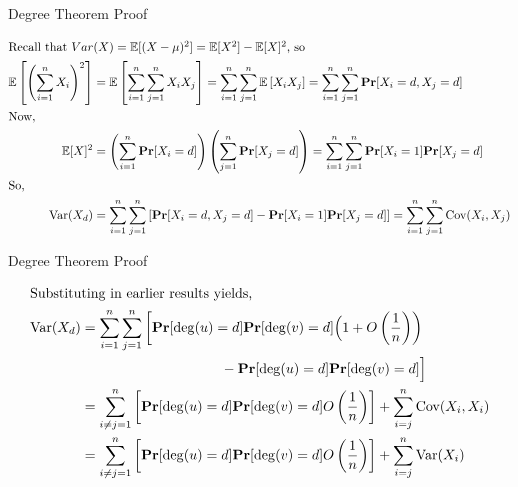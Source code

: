 \begin{frame}{Degree Theorem Proof}
    \setlength{\abovedisplayskip}{2pt}
        \setlength{\belowdisplayskip}{0pt}
        \setlength{\abovedisplayshortskip}{2pt}
        \setlength{\belowdisplayshortskip}{0pt}
    \begin{proofs}
        \begin{align*}
            \intertext{Recall that $Var(X) = \mathbb{E}[(X - \mu)^2] = \mathbb{E}[X^2] - \mathbb{E}[X]^2$, so}
            \mathbb{E}\left[\left(\sum_{i = 1}^n X_i\right)^2\right] &= \mathbb{E}\left[\sum_{i = 1}^n \sum_{j = 1}^n X_iX_j\right]  = \sum_{i = 1}^n \sum_{j = 1}^n\mathbb{E}\left[X_iX_j\right] = \sum_{i = 1}^n \sum_{j = 1}^n\textbf{Pr}[X_i = d, X_j = d]\\
            \intertext{Now,}
            \mathbb{E}[X]^2 &= \left(\sum_{i = 1}^n\textbf{Pr}[X_i = d]\right)\left(\sum_{j = 1}^n\textbf{Pr}[X_j = d]\right) = \sum_{ i =1}^n \sum_{j = 1}^n \textbf{Pr}[X_i = 1] \textbf{Pr}[X_j = d]\\
            \intertext{So,}
            \text{Var}(X_d) &= \sum_{ i =1}^n \sum_{j = 1}^n \left[\textbf{Pr}[X_i = d, X_j = d] - \textbf{Pr}[X_i = 1] \textbf{Pr}[X_j = d]\right] = \sum_{i = 1}^n\sum_{j = 1}^n \text{Cov}(X_i, X_j)
        \end{align*}
    \end{proofs}
\end{frame}

\begin{frame}{Degree Theorem Proof}
    \setlength{\abovedisplayskip}{2pt}
        \setlength{\belowdisplayskip}{0pt}
        \setlength{\abovedisplayshortskip}{2pt}
        \setlength{\belowdisplayshortskip}{0pt}
    \begin{proofs}
        \begin{align*}
            \intertext{Substituting in earlier results yields,}
            \text{Var}(X_d) &= \sum_{ i =1}^n \sum_{j = 1}^n \left[\textbf{Pr}[\deg(u) = d]\textbf{Pr}[\deg(v) = d]\Big(1 + O\left(\frac{1}{n}\right)\right) \\
            &\qquad \qquad \qquad \qquad \qquad- \textbf{Pr}[\deg(u) = d]\textbf{Pr}[\deg(v) = d]\Big]\\
            &= \sum_{i \neq j = 1}^n \left[\textbf{Pr}[\deg(u) = d]\textbf{Pr}[\deg(v) = d]O\left(\frac{1}{n}\right)\right] + \sum_{i = j}^n \text{Cov}(X_i, X_i)\\
            &= \sum_{i \neq j = 1}^n \left[\textbf{Pr}[\deg(u) = d]\textbf{Pr}[\deg(v) = d]O\left(\frac{1}{n}\right)\right] + \sum_{i = j}^n \text{Var}(X_i)
        \end{align*}
    \end{proofs}
\end{frame}

